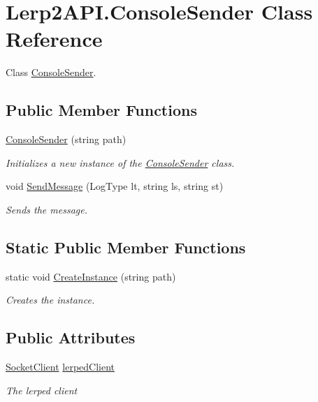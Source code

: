 \hypertarget{class_lerp2_a_p_i_1_1_console_sender}{}\section{Lerp2\+A\+P\+I.\+Console\+Sender Class Reference}
\label{class_lerp2_a_p_i_1_1_console_sender}


Class \hyperlink{class_lerp2_a_p_i_1_1_console_sender}{Console\+Sender}.  


\subsection*{Public Member Functions}
\begin{DoxyCompactItemize}
\item 
\hyperlink{class_lerp2_a_p_i_1_1_console_sender_a9d97c8171ec717937c16ed9d7408062b}{Console\+Sender} (string path)
\begin{DoxyCompactList}\small\item\em Initializes a new instance of the \hyperlink{class_lerp2_a_p_i_1_1_console_sender}{Console\+Sender} class. \end{DoxyCompactList}\item 
void \hyperlink{class_lerp2_a_p_i_1_1_console_sender_a99dda76f7b5e67426ea3a68b7a1f3b8a}{Send\+Message} (Log\+Type lt, string ls, string st)
\begin{DoxyCompactList}\small\item\em Sends the message. \end{DoxyCompactList}\end{DoxyCompactItemize}
\subsection*{Static Public Member Functions}
\begin{DoxyCompactItemize}
\item 
static void \hyperlink{class_lerp2_a_p_i_1_1_console_sender_ac71c6d5e24ce1a27f8de614ec393e17c}{Create\+Instance} (string path)
\begin{DoxyCompactList}\small\item\em Creates the instance. \end{DoxyCompactList}\end{DoxyCompactItemize}
\subsection*{Public Attributes}
\begin{DoxyCompactItemize}
\item 
\hyperlink{class_lerp2_a_p_i_1_1_communication_1_1_sockets_1_1_socket_client}{Socket\+Client} \hyperlink{class_lerp2_a_p_i_1_1_console_sender_a6b5be36001e4cac83e8adf2b5b2dba1e}{lerped\+Client}
\begin{DoxyCompactList}\small\item\em The lerped client \end{DoxyCompactList}\end{DoxyCompactItemize}
